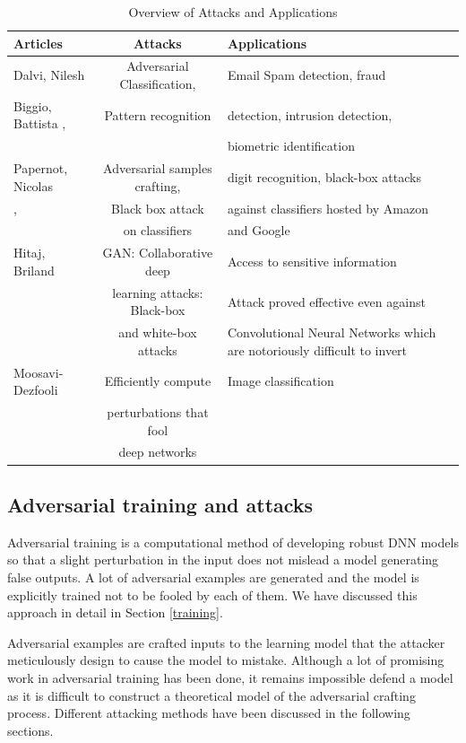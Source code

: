 \documentclass[a4paper]{article}
\begin{document}
\begin{table}[h!]
	\centering
	\begin{tabular}{l|c|V}
		Articles & Attacks & Applications\\
		\hline
		Dalvi, Nilesh \cite{dalvi2004adversarial} & Adversarial Classification, & Email Spam detection, fraud \\Biggio, Battista \cite{biggio2008adversarial}, \cite{biggio2014security} & Pattern recognition & detection, intrusion detection, \\ & & biometric identification\\
        \hline
    Papernot, Nicolas & Adversarial samples crafting, & digit recognition, black-box attacks \\ \cite{papernot2017practical}, \cite{papernot2016transferability} & Black box attack & against classifiers hosted by Amazon\\ & on classifiers &and Google \\
    \hline
    Hitaj, Briland \cite{hitaj2017deep} & GAN: Collaborative deep & Access to sensitive information\\ & learning attacks: Black-box & Attack proved effective even against\\ & and white-box attacks & Convolutional Neural Networks which are
     notoriously difficult to invert\\
     \hline
    Moosavi-Dezfooli \cite{moosavi2016deepfool} & Efficiently compute & Image classification \\ & perturbations that fool \\ & deep networks 
    
    \end{tabular}
    \caption{Overview of Attacks and Applications}
	\label{tab:table3}
\end{table}

\subsection*{Adversarial training and attacks}
Adversarial training is a computational method of developing robust DNN models so that a slight perturbation in the input does not mislead a model generating false outputs. A lot of adversarial examples are generated and the model is explicitly trained not to be fooled by each of them. We have discussed this approach in detail in Section \ref{training}. 

Adversarial examples are crafted inputs to the learning model that the attacker meticulously design to cause the model to mistake. Although a lot of promising work in adversarial training has been done, it remains impossible defend a model as it is difficult to construct a theoretical model of the adversarial crafting process. Different attacking methods have been discussed in the following sections. 
\end{document}
